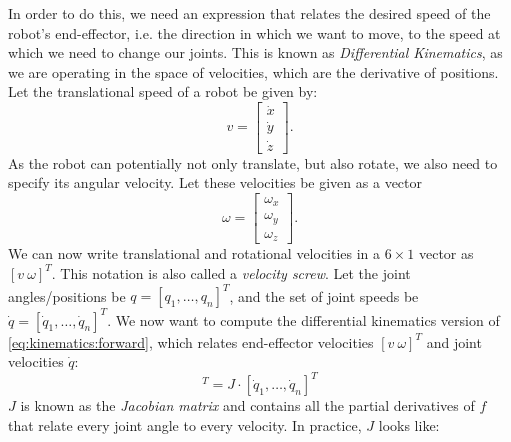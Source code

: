 In order to do this, we need an expression that relates the desired speed of the robot's end-effector, i.e. the direction in which we want to move, to the speed at which we need to change our joints.
This is known as \emph{Differential Kinematics}, as we are operating in the space of velocities, which are the derivative of positions.
Let the translational speed of a robot be given by:
\begin{equation}
v=\left[\begin{array}{c}
\dot{x}\\
\dot{y}\\
\dot{z}
\end{array}
\right].
\end{equation}
As the robot can potentially not only translate, but also rotate, we also need to specify its angular velocity. Let these velocities be given as a vector
\begin{equation}
\omega=\left[\begin{array}{c}
\omega_x\\
\omega_y\\
\omega_z
\end{array}
\right].
\end{equation}
We can now write translational and rotational velocities in a $6\times1$ vector as $[v \ \omega]^T$.
This notation is also called a \emph{velocity screw}. %
Let the joint angles/positions be $q=[q_1, \ldots, q_n]^T$, and the set of joint speeds be $\dot{q}=[\dot{q}_1, \ldots, \dot{q}_n]^T$.
%
We now want to compute the differential kinematics version of \cref{eq:kinematics:forward}, which relates end-effector velocities $[v \ \omega]^T$ and joint velocities $\dot{q}$:
\begin{equation}
[v \quad \omega]^T=J\cdot [\dot{q}_1,\ldots,\dot{q}_n]^T
\end{equation}
$J$ is known as the \emph{Jacobian matrix}  and contains all the partial derivatives of $f$ that relate every joint angle to every velocity. In practice, $J$ looks like:

